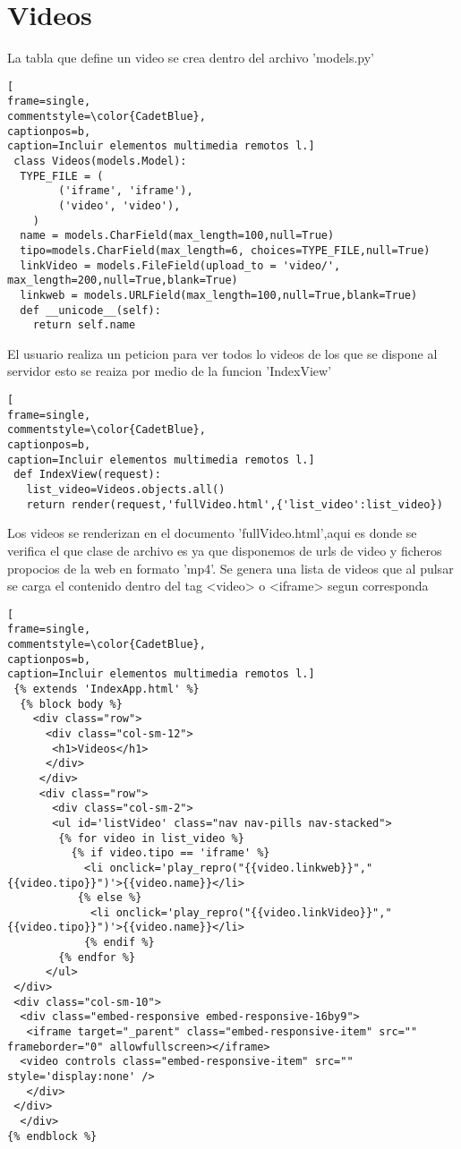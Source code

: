 \section{Videos}
La  tabla que define un video se crea dentro del archivo 'models.py'
\lstset{language=, breaklines=true, basicstyle=\footnotesize}
\begin{lstlisting}[
frame=single,
commentstyle=\color{CadetBlue},
captionpos=b,
caption=Incluir elementos multimedia remotos l.]
 class Videos(models.Model):
  TYPE_FILE = (
        ('iframe', 'iframe'),
        ('video', 'video'),
    )
  name = models.CharField(max_length=100,null=True)
  tipo=models.CharField(max_length=6, choices=TYPE_FILE,null=True)
  linkVideo = models.FileField(upload_to = 'video/', max_length=200,null=True,blank=True)
  linkweb = models.URLField(max_length=100,null=True,blank=True)
  def __unicode__(self):
    return self.name
\end{lstlisting}
El usuario realiza un peticion para ver todos lo videos de los que se dispone al servidor esto se reaiza por medio de la funcion 'IndexView'
\lstset{language=, breaklines=true, basicstyle=\footnotesize}
\begin{lstlisting}[
frame=single,
commentstyle=\color{CadetBlue},
captionpos=b,
caption=Incluir elementos multimedia remotos l.]
 def IndexView(request):
   list_video=Videos.objects.all()
   return render(request,'fullVideo.html',{'list_video':list_video})
\end{lstlisting}
Los videos se renderizan en el documento 'fullVideo.html',aqui es donde se verifica el que clase de archivo es ya que disponemos de urls de video y ficheros propocios de la web en formato 'mp4'.
Se genera una lista de videos que al pulsar se carga  el contenido dentro del tag <video> o <iframe> segun corresponda 
\lstset{language=, breaklines=true, basicstyle=\footnotesize}
\begin{lstlisting}[
frame=single,
commentstyle=\color{CadetBlue},
captionpos=b,
caption=Incluir elementos multimedia remotos l.]
 {% extends 'IndexApp.html' %}
  {% block body %}
    <div class="row">
	  <div class="col-sm-12">
	   <h1>Videos</h1>
	  </div>
	 </div>
     <div class="row">
       <div class="col-sm-2">
	   <ul id='listVideo' class="nav nav-pills nav-stacked">
		{% for video in list_video %}
		  {% if video.tipo == 'iframe' %}
		    <li onclick='play_repro("{{video.linkweb}}","{{video.tipo}}")'>{{video.name}}</li>
		   {% else %}
	         <li onclick='play_repro("{{video.linkVideo}}","{{video.tipo}}")'>{{video.name}}</li>
		    {% endif %}
		{% endfor %}
	  </ul>
 </div>
 <div class="col-sm-10">
  <div class="embed-responsive embed-responsive-16by9">
   <iframe target="_parent" class="embed-responsive-item" src="" frameborder="0" allowfullscreen></iframe>
  <video controls class="embed-responsive-item" src="" style='display:none' />
   </div>
 </div>
  </div>
{% endblock %}
\end{lstlisting}

